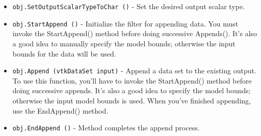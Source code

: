 \begin{itemize}
\item  \verb|obj.SetOutputScalarTypeToChar ()| -  Set the desired output scalar type.

\item  \verb|obj.StartAppend ()| -  Initialize the filter for appending data. You must invoke the
 StartAppend() method before doing successive Appends(). It's also a
 good idea to manually specify the model bounds; otherwise the input
 bounds for the data will be used.

\item  \verb|obj.Append (vtkDataSet input)| -  Append a data set to the existing output. To use this function,
 you'll have to invoke the StartAppend() method before doing
 successive appends. It's also a good idea to specify the model
 bounds; otherwise the input model bounds is used. When you've
 finished appending, use the EndAppend() method.

\item  \verb|obj.EndAppend ()| -  Method completes the append process.

\end{itemize}
